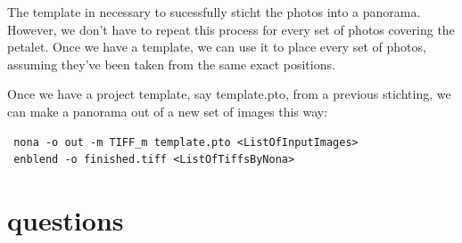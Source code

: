 \documentclass[a4paper,10pt]{article}
\begin{document}
The template in necessary to sucessfully sticht the photos into a panorama. However, we don't have to repeat this
process for every set of photos covering the petalet. Once we have a template, we can use it to place every
set of photos, assuming they've been taken from the same exact positions.

Once we have a project template, say template.pto, from a previous stichting, we can make a panorama out of a new
set of images this way:
\begin{verbatim}
 nona -o out -m TIFF_m template.pto <ListOfInputImages>
 enblend -o finished.tiff <ListOfTiffsByNona>
\end{verbatim}


\section{questions}
\end{document}

